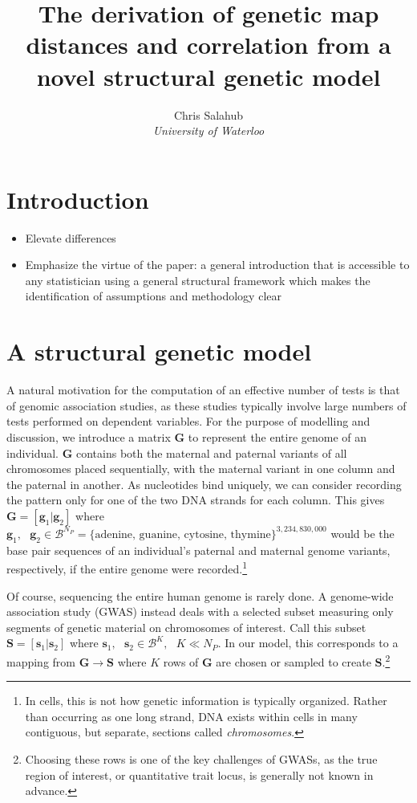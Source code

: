 \documentclass{article}
\title{The derivation of genetic map distances and correlation from a novel structural genetic model}
\author{Chris Salahub \\
	\textit{University of Waterloo}}
\newcommand{\ve}[1]{\mathbf{#1}}           %
\newcommand{\m}[1]{\mathbf{#1}}               %
\begin{document}
	
\maketitle

\section{Introduction} \label{sec:intro}




\begin{itemize}
	\item Elevate differences
	\item Emphasize the virtue of the paper: a general introduction that is accessible to any statistician using a general structural framework which makes the identification of assumptions and methodology clear
\end{itemize}

\section{A structural genetic model} \label{sec:theModel}

A natural motivation for the computation of an effective number of tests is that of genomic association studies, as these studies typically involve large numbers of tests performed on dependent variables. For the purpose of modelling and discussion, we introduce a matrix $\m{G}$ to represent the entire genome of an individual. $\m{G}$ contains both the maternal and paternal variants of all chromosomes placed sequentially, with the maternal variant in one column and the paternal in another. As nucleotides bind uniquely, we can consider recording the pattern only for one of the two DNA strands for each column. This gives $\m{G} = [\ve{g}_1| \ve{g}_2]$ where $\ve{g}_1,\text{ } \ve{g}_2 \in \mathcal{B}^{N_P} = \{\text{adenine, guanine, cytosine, thymine}\}^{3,234,830,000}$ would be the base pair sequences of an individual's paternal and maternal genome variants, respectively, if the entire genome were recorded.\footnote{In cells, this is not how genetic information is typically organized. Rather than occurring as one long strand, DNA exists within cells in many contiguous, but separate, sections called \textit{chromosomes}.}

Of course, sequencing the entire human genome is rarely done. A genome-wide association study (GWAS) instead deals with a selected subset measuring only segments of genetic material on chromosomes of interest. Call this subset $\m{S} = [\ve{s}_1 | \ve{s}_2]$ where $\ve{s}_1, \text{ } \ve{s}_2 \in \mathcal{B}^K, \text{ } K \ll N_P$. In our model, this corresponds to a mapping from $\m{G} \rightarrow \m{S}$ where $K$ rows of $\m{G}$ are chosen or sampled to create $\m{S}$.\footnote{Choosing these rows is one of the key challenges of GWASs, as the true region of interest, or quantitative trait locus, is generally not known in advance.}
\end{document}
